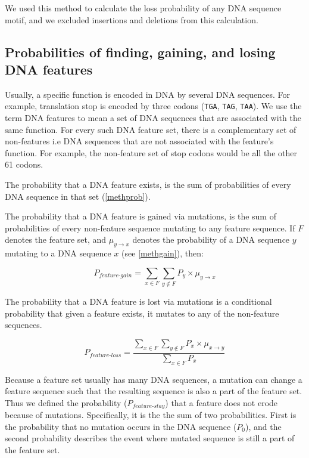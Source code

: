 \documentclass[12pt,a4paper]{article}
\begin{document}
We used this method to calculate the loss probability of any DNA sequence motif, and we excluded insertions and deletions from this calculation.

\subsection{Probabilities of finding, gaining, and losing DNA features}
\label{methfeatures}

Usually, a specific function is encoded in DNA by several DNA sequences. For example, translation stop is encoded by three codons (\texttt{TGA}, \texttt{TAG}, \texttt{TAA}). We use the term DNA features to mean a set of DNA sequences that are associated with the same function. For every such DNA feature set, there is a complementary set of non-features i.e DNA sequences that are not associated with the feature's function. For example, the non-feature set of stop codons would be all the other 61 codons. 

The probability that a DNA feature exists, is the sum of probabilities of every DNA sequence in that set (\autoref{methprob}).

The probability that a DNA feature is gained via mutations, is the sum of probabilities of every non-feature sequence mutating to any feature sequence. If $F$ denotes the feature set, and $\mu_{y\to x}$ denotes the probability of a DNA sequence $y$ mutating to a DNA sequence $x$ (see \autoref{methgain}), then:

\begin{equation}
P_\textit{feature-gain} = \sum_{x \in F} \sum_{y \notin F} P_y \times \mu_{y\to x}
\end{equation}

The probability that a DNA feature is lost via mutations is a conditional probability that given a feature exists, it mutates to any of the non-feature sequences. 

\begin{equation}
P_\textit{feature-loss} = \frac{\displaystyle\sum_{x \in F} \sum_{y \notin F} P_x \times \mu_{x\to y}}{\displaystyle\sum_{x \in F} P_x}
\end{equation}

Because a feature set usually has many DNA sequences, a mutation can change a feature sequence such that the resulting sequence is also a part of the feature set. Thus we defined the probability ($P_\textit{feature-stay}$) that a feature does not erode because of mutations. Specifically, it is the the sum of two probabilities. First is the probability that no mutation occurs in the DNA sequence ($P_0$), and the second probability describes the event where mutated sequence is still a part of the feature set.
\end{document}
